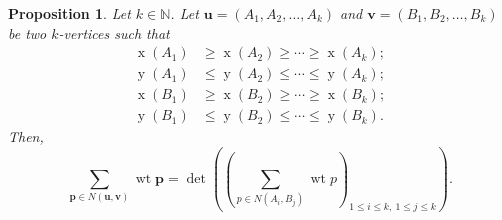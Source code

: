 \documentclass[reqno]{amsart}%
\newcommand{\0}{\phantom{c}}
\let\sumnonlimits\sum
\renewcommand{\sum}{\sumnonlimits\limits}
\theoremstyle{plain}
\newtheorem{prop}[thm]{Proposition}
\theoremstyle{definition}
\numberwithin{equation}{section}
\begin{document}
\begin{prop}
\label{prop.LGV.concrete}Let $k\in\mathbb{N}$. Let $\mathbf{u}=\left(
A_{1},A_{2},\ldots,A_{k}\right)  $ and $\mathbf{v}=\left(  B_{1},B_{2}%
,\ldots,B_{k}\right)  $ be two $k$-vertices such that%
\begin{align*}
\operatorname*{x}\left(  A_{1}\right)   &  \geq\operatorname*{x}\left(
A_{2}\right)  \geq\cdots\geq\operatorname*{x}\left(  A_{k}\right)  ;\\
\operatorname*{y}\left(  A_{1}\right)   &  \leq\operatorname*{y}\left(
A_{2}\right)  \leq\cdots\leq\operatorname*{y}\left(  A_{k}\right)  ;\\
\operatorname*{x}\left(  B_{1}\right)   &  \geq\operatorname*{x}\left(
B_{2}\right)  \geq\cdots\geq\operatorname*{x}\left(  B_{k}\right)  ;\\
\operatorname*{y}\left(  B_{1}\right)   &  \leq\operatorname*{y}\left(
B_{2}\right)  \leq\cdots\leq\operatorname*{y}\left(  B_{k}\right)  .
\end{align*}
Then,%
\[
\sum_{\mathbf{p}\in N\left(  \mathbf{u},\mathbf{v}\right)  }\operatorname*{wt}%
\mathbf{p}=\det\left(  \left(  \sum_{p\in N\left(  A_{i},B_{j}\right)
}\operatorname*{wt}p\right)  _{1\leq i\leq k,\ 1\leq j\leq k}\right)  .
\]

\end{prop}
\end{document}
